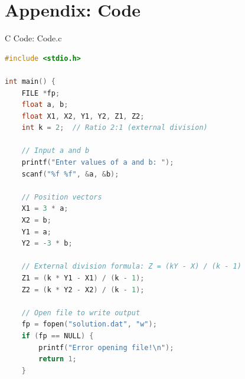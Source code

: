 \documentclass{beamer}
\numberwithin{equation}{section}
\theoremstyle{remark}
\begin{document}
\section*{Appendix: Code}

\begin{frame}[fragile]{C Code: Code.c}
\begin{lstlisting}[language=C]
#include <stdio.h>

int main() {
    FILE *fp;
    float a, b;
    float X1, X2, Y1, Y2, Z1, Z2;
    int k = 2;  // Ratio 2:1 (external division)

    // Input a and b
    printf("Enter values of a and b: ");
    scanf("%f %f", &a, &b);

    // Position vectors
    X1 = 3 * a;
    X2 = b;
    Y1 = a;
    Y2 = -3 * b;

    // External division formula: Z = (kY - X) / (k - 1)
    Z1 = (k * Y1 - X1) / (k - 1);
    Z2 = (k * Y2 - X2) / (k - 1);

    // Open file to write output
    fp = fopen("solution.dat", "w");
    if (fp == NULL) {
        printf("Error opening file!\n");
        return 1;
    }
 \end{lstlisting}
\end{frame}
\end{document}
